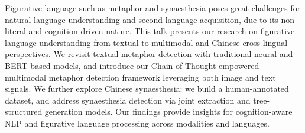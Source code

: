 Figurative language such as metaphor and synaesthesia poses great challenges for natural language understanding and second language acquisition, due to its non-literal and cognition-driven nature. This talk presents our research on figurative-language understanding from textual to multimodal and Chinese cross-lingual perspectives. We revisit textual metaphor detection with traditional neural and BERT-based models, and introduce our Chain-of-Thought empowered multimodal metaphor detection framework leveraging both image and text signals. We further explore Chinese synaesthesia: we build a human-annotated dataset, and address synaesthesia detection via joint extraction and tree-structured generation models. Our findings provide insights for cognition-aware NLP and figurative language processing across modalities and languages.

